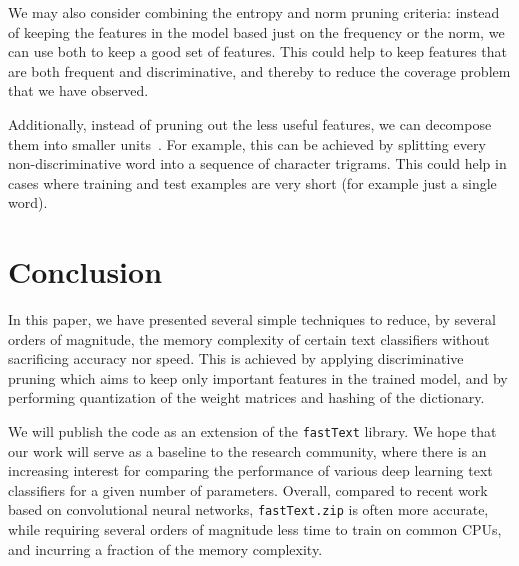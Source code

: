 We may also consider combining the entropy and norm pruning criteria: instead of keeping the features in the model based just on the frequency or the norm, we can use both to keep a good set of features. This could help to keep features that are both frequent and discriminative, and thereby to reduce the coverage problem that we have observed.

Additionally, instead of pruning out the less useful features, we can decompose them into smaller units~\citep{mikolov2012subword}. For example, this can be achieved by splitting every non-discriminative word into a sequence of character trigrams. This could help in cases where training and test examples are very short (for example just a single word).

\section{Conclusion}

In this paper, we have presented several simple techniques to reduce, by several orders of magnitude, the memory complexity of certain text classifiers without sacrificing accuracy nor speed. This is achieved by applying discriminative pruning which aims to keep only important features in the trained model, and by performing quantization of the weight matrices and hashing of the dictionary.

We will publish the code as an extension of the \texttt{fastText} library. We hope that our work will serve as a baseline to the research community, where there is an increasing interest for comparing the performance of various deep learning text classifiers for a given number of parameters. Overall, compared to recent work based on convolutional neural networks,
  \texttt{fastText.zip} is often more accurate, while requiring several orders of magnitude less time to train on common CPUs, and incurring a fraction of the memory complexity. 


